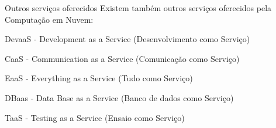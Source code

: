\begin{frame}{Outros serviços oferecidos}
    Existem também outros serviços oferecidos pela Computação em Nuvem:
    \begin{itemise}
        \item<2-> DevaaS - Development as a Service (Desenvolvimento como Serviço)
        \item<3-> CaaS - Communication as a Service (Comunicação como Serviço) 
        \item<4-> EaaS - Everything as a Service (Tudo como Serviço) 
        \item<5-> DBaas - Data Base as a Service (Banco de dados como Serviço) 
        \item<6-> TaaS  - Testing as a Service  (Ensaio como Serviço) 
    \end{itemise}
\end{frame}
